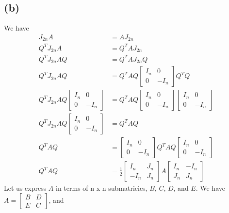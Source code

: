 \subsection*{(b)}
We have
\begin{align*}
    J_{2n}A&=AJ_{2n}\\
    Q^TJ_{2n}A&=Q^TAJ_{2n}\\
    Q^TJ_{2n}AQ&=Q^TAJ_{2n}Q\\
    Q^TJ_{2n}AQ&=Q^TAQ\begin{bmatrix}
        I_n & 0\\
        0 & -I_n
    \end{bmatrix}Q^TQ\\
    Q^TJ_{2n}AQ\begin{bmatrix}
        I_n & 0\\
        0 & -I_n
    \end{bmatrix}&=Q^TAQ\begin{bmatrix}
        I_n & 0\\
        0 & -I_n
    \end{bmatrix}\begin{bmatrix}
        I_n & 0\\
        0 & -I_n
    \end{bmatrix}\\
    Q^TJ_{2n}AQ\begin{bmatrix}
        I_n & 0\\
        0 & -I_n
    \end{bmatrix}&=Q^TAQ\\
    Q^TAQ&=\begin{bmatrix}
        I_n & 0\\
        0 & -I_n
    \end{bmatrix}Q^TAQ\begin{bmatrix}
        I_n & 0\\
        0 & -I_n
    \end{bmatrix}\\
    Q^TAQ&=\frac{1}{2} \begin{bmatrix}
        I_n & J_n\\
        -I_n & J_n
    \end{bmatrix} A \begin{bmatrix}
        I_n & -I_n\\
        J_n & J_n
    \end{bmatrix}
\end{align*}
Let us express $A$ in terms of n x n submatricies, $B$, $C$, $D$, and $E$. 
We have
$A=\begin{bmatrix}
    B & D\\
    E & C
\end{bmatrix}$, and
